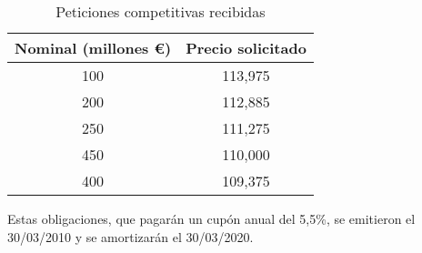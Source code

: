 \begin{table}[H]
\centering
\begin{tabular}{|c|c|}
\hline
Nominal (millones €) & Precio solicitado \\ \hline
100                  & 113,975           \\ \hline
200                  & 112,885           \\ \hline
250                  & 111,275           \\ \hline
450                  & 110,000           \\ \hline
400                  & 109,375           \\ \hline
\end{tabular}
\caption{Peticiones competitivas recibidas}
\end{table}

Estas obligaciones, que pagarán un cupón anual del 5,5\%, se emitieron el 30/03/2010 y se amortizarán el 30/03/2020.

